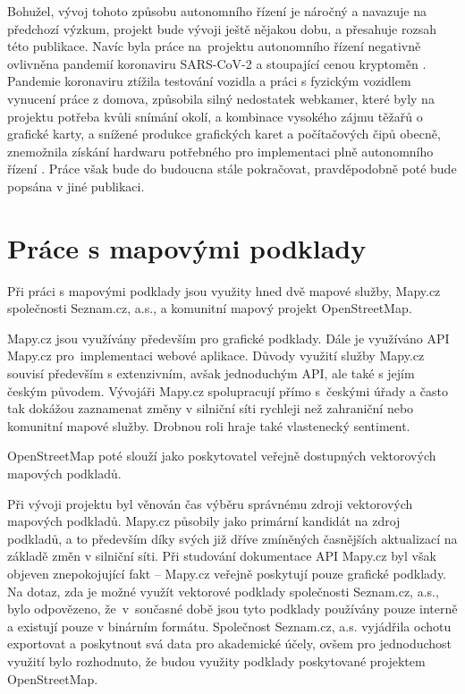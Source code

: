 \documentclass[czech, bachelor]{diploma}
\begin{document}
Bohužel, vývoj tohoto způsobu autonomního řízení je náročný a navazuje na předchozí výzkum, projekt bude vývoji ještě nějakou
dobu, a přesahuje rozsah této publikace. Navíc byla práce na~projektu autonomního řízení negativně ovlivněna pandemií koronaviru
SARS-CoV-2 \cite{pandemic-source} a stoupající cenou kryptoměn \cite{bitcoin-rally-source}. Pandemie koronaviru ztížila testování
vozidla a práci s fyzickým vozidlem vynucení práce z domova, způsobila silný nedostatek webkamer, které byly na projektu potřeba
kvůli snímání okolí, a kombinace vysokého zájmu těžařů o grafické karty, a snížené produkce grafických karet a počítačových čipů
obecně, znemožnila získání hardwaru potřebného pro implementaci plně autonomního řízení
\cite{bitcoin-miners-gpu-source,webcam-shortage-source}. Práce však bude do budoucna stále pokračovat, pravděpodobně poté bude
popsána v jiné publikaci.

\chapter{Práce s mapovými podklady} \label{osm-chapter}

Při práci s mapovými podklady jsou využity hned dvě mapové služby, Mapy.cz společnosti Seznam.cz, a.s., a komunitní mapový projekt
OpenStreetMap.

Mapy.cz jsou využívány především pro grafické podklady. Dále je využíváno API Mapy.cz pro~implementaci webové aplikace. Důvody
využití služby Mapy.cz souvisí především s extenzivním, avšak jednoduchým API, ale také s jejím českým původem. Vývojáři Mapy.cz
spolupracují přímo s~českými úřady a často tak dokážou zaznamenat změny v silniční síti rychleji než zahraniční nebo komunitní
mapové služby. Drobnou roli hraje také vlastenecký sentiment.

OpenStreetMap poté slouží jako poskytovatel veřejně dostupných vektorových mapových podkladů.

Při vývoji projektu byl věnován čas výběru správnému zdroji vektorových mapových podkladů. Mapy.cz působily jako primární kandidát
na zdroj podkladů, a to především díky svých již dříve zmíněných časnějších aktualizací na základě změn v silniční síti.
Při studování dokumentace API Mapy.cz byl však objeven znepokojující fakt -- Mapy.cz veřejně poskytují pouze grafické podklady.
Na dotaz, zda je možné využít vektorové podklady společnosti Seznam.cz, a.s., bylo odpovězeno, že~v~současné době jsou tyto
podklady používány pouze interně a existují pouze v binárním formátu. Společnost Seznam.cz, a.s. vyjádřila ochotu exportovat
a poskytnout svá data pro akademické účely, ovšem pro jednoduchost využití bylo rozhodnuto, že budou využity podklady poskytované
projektem OpenStreetMap.
\end{document}
